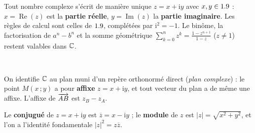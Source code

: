 \noindent
\begin{minipage}[c]{0.6\linewidth}
\begin{definition}
Tout nombre complexe s'écrit de manière unique $z=x+\mathrm{i}y$ avec
$x,y\in1.9$ : $x=\operatorname{Re}(z)$ est la \textbf{partie réelle},
$y=\operatorname{Im}(z)$ la \textbf{partie imaginaire}. Les règles de calcul
sont celles de $1.9$, complétées par $\mathrm{i}^{2}=-1$. Le binôme, la
factorisation de $a^{n}-b^{n}$ et la somme géométrique
$\sum_{k=0}^{n}z^{k}=\frac{1-z^{n+1}}{1-z}$ ($z\neq1$) restent valables
dans $\mathbb{C}$.
\end{definition}
\end{minipage}\hfill
\begin{minipage}[c]{0.36\linewidth}
\centering
{}\\[0.5mm]
\end{minipage}

\vspace{1mm}
On identifie $\mathbb{C}$ au plan muni d'un repère orthonormé direct (\emph{plan
complexe}) : le point $M(x\,;y)$ a pour \textbf{affixe} $z=x+\mathrm{i}y$, et
tout vecteur du plan a de même une affixe. L'affixe de
$\overrightarrow{AB}$ est $z_B-z_A$.


\begin{definition}
Le \textbf{conjugué} de $z=x+\mathrm{i}y$ est $\overline{z}=x-\mathrm{i}y$ ;
le \textbf{module} de $z$ est $|z|=\sqrt{x^{2}+y^{2}}$, et l'on a l'identité
fondamentale $|z|^{2}=z\overline{z}$.
\end{definition}

